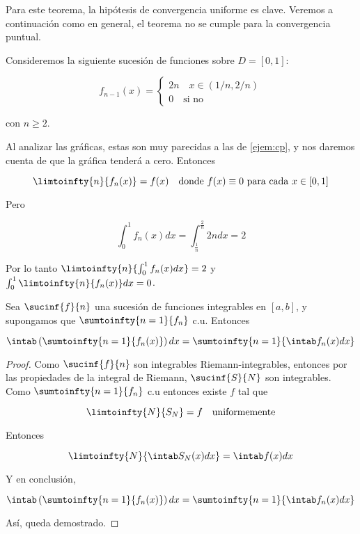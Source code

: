 Para este teorema, la hipótesis de convergencia uniforme es clave. Veremos a continuación como en general, el teorema no se cumple para la convergencia puntual.

\begin{ejem}
    Consideremos la siguiente sucesión de funciones sobre $D = [0,1]$:
    
    \[
    f_{n-1}(x) = \begin{cases}
                 2n \quad x \in (1/n, 2/n) \\
                 0  \quad \text{si no}
             \end{cases}
    \]
    
    \noindent con $n \geq 2$.
    
    Al analizar las gráficas, estas son muy parecidas a las de \ref{ejem:cp}, y nos daremos cuenta de que la gráfica tenderá a cero. Entonces
    
    \[
    \limtoinfty{n}{f_n(x)} = f(x) \quad \text{donde $f(x) \equiv 0$ para cada $x \in [0,1]$}
    \]
    
    Pero
    
    \[
    \int_0^1 f_n(x)dx = \int_{\frac{1}{n}}^{\frac{2}{n}} 2ndx = 2
    \]
    
    Por lo tanto $\limtoinfty{n}{\int_0^1 f_n(x)dx} = 2$ y $\int_0^1 \limtoinfty{n}{f_n(x)}dx = 0$.
\end{ejem}

\begin{cor}
    Sea $\sucinf{f}{n}$ una sucesión de funciones integrables en $[a,b]$, y supongamos que $\sumtoinfty{n=1}{f_n}$ c.u. Entonces
    
    \[
    \intab \left(\sumtoinfty{n=1}{f_n(x)}\right)dx = \sumtoinfty{n=1}{\intab f_n(x)dx}
    \]
\end{cor}

\begin{proof}
    Como $\sucinf{f}{n}$ son integrables Riemann-integrables, entonces por las propiedades de la integral de Riemann, $\sucinf{S}{N}$ son integrables. Como $\sumtoinfty{n=1}{f_n}$ c.u entonces existe $f$ tal que
    
    \[
    \limtoinfty{N}{S_N} = f \quad \text{uniformemente}
    \]
    
    Entonces
    
    \[
    \limtoinfty{N}{\intab S_N(x)dx} = \intab f(x)dx
    \]
    
    Y en conclusión,
    
    \[
    \intab \left(\sumtoinfty{n=1}{f_n(x)}\right)dx = \sumtoinfty{n=1}{\intab f_n(x)dx}
    \]
    
    Así, queda demostrado.
\end{proof}

